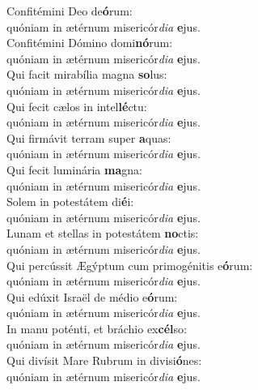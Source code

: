 \evenverse Confitémini Deo de\textbf{ó}rum:~\*\\
\evenverse quóniam in ætérnum misericór\textit{di}\textit{a} \textbf{e}jus.\\
\oddverse Confitémini Dómino domi\textbf{nó}rum:~\*\\
\oddverse quóniam in ætérnum misericór\textit{di}\textit{a} \textbf{e}jus.\\
\evenverse Qui facit mirabília magna \textbf{so}lus:~\*\\
\evenverse quóniam in ætérnum misericór\textit{di}\textit{a} \textbf{e}jus.\\
\oddverse Qui fecit cælos in intel\textbf{lé}ctu:~\*\\
\oddverse quóniam in ætérnum misericór\textit{di}\textit{a} \textbf{e}jus.\\
\evenverse Qui firmávit terram super \textbf{a}quas:~\*\\
\evenverse quóniam in ætérnum misericór\textit{di}\textit{a} \textbf{e}jus.\\
\oddverse Qui fecit luminária \textbf{ma}gna:~\*\\
\oddverse quóniam in ætérnum misericór\textit{di}\textit{a} \textbf{e}jus.\\
\evenverse Solem in potestátem di\textbf{é}i:~\*\\
\evenverse quóniam in ætérnum misericór\textit{di}\textit{a} \textbf{e}jus.\\
\oddverse Lunam et stellas in potestátem \textbf{no}ctis:~\*\\
\oddverse quóniam in ætérnum misericór\textit{di}\textit{a} \textbf{e}jus.\\
\evenverse Qui percússit Ægýptum cum primogénitis e\textbf{ó}rum:~\*\\
\evenverse quóniam in ætérnum misericór\textit{di}\textit{a} \textbf{e}jus.\\
\oddverse Qui edúxit Israël de médio e\textbf{ó}rum:~\*\\
\oddverse quóniam in ætérnum misericór\textit{di}\textit{a} \textbf{e}jus.\\
\evenverse In manu poténti, et bráchio ex\textbf{cél}so:~\*\\
\evenverse quóniam in ætérnum misericór\textit{di}\textit{a} \textbf{e}jus.\\
\oddverse Qui divísit Mare Rubrum in divisi\textbf{ó}nes:~\*\\
\oddverse quóniam in ætérnum misericór\textit{di}\textit{a} \textbf{e}jus.\\
